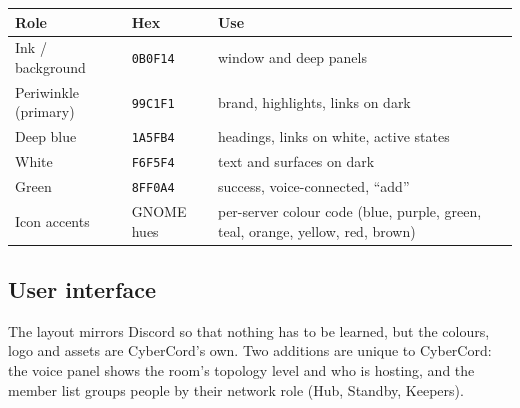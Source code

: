 \documentclass[11pt,a4paper]{article}
\begin{document}
\begin{center}
\end{center}

\begin{center}\small
\begin{tabularx}{\linewidth}{@{}l l Y@{}}
\toprule
\textbf{Role} & \textbf{Hex} & \textbf{Use} \\
\midrule
Ink / background & \texttt{0B0F14} & window and deep panels \\
Periwinkle (primary) & \texttt{99C1F1} & brand, highlights, links on dark \\
Deep blue & \texttt{1A5FB4} & headings, links on white, active states \\
White & \texttt{F6F5F4} & text and surfaces on dark \\
Green & \texttt{8FF0A4} & success, voice-connected, ``add'' \\
Icon accents & GNOME hues & per-server colour code (blue, purple, green, teal, orange, yellow, red, brown) \\
\bottomrule
\end{tabularx}
\end{center}

\subsection{User interface}

The layout mirrors Discord so that nothing has to be learned, but the colours, logo and
assets are CyberCord's own. Two additions are unique to CyberCord: the voice panel shows
the room's topology level and who is hosting, and the member list groups people by their
network role (Hub, Standby, Keepers).
\end{document}
